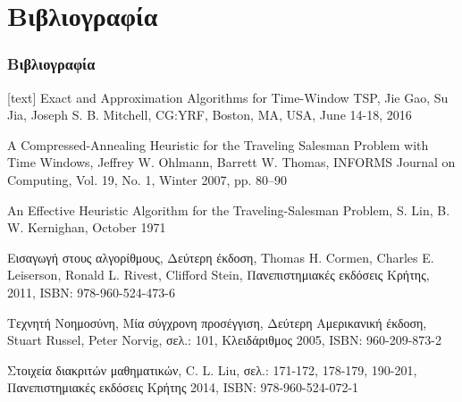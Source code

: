 \documentclass[xcolor=dvipsnames, 11pt]{beamer}
\begin{document}
\section{Βιβλιογραφία}
\begin{frame}
	\frametitle{Βιβλιογραφία}
	\footnotesize
	\begin{thebibliography}{depth}
		Exact and Approximation Algorithms for Time-Window TSP, 
		Jie Gao, Su Jia, Joseph S. B. Mitchell,
		CG:YRF, Boston, MA, USA, June 14-18, 2016
		
		A Compressed-Annealing Heuristic for the Traveling Salesman Problem with Time Windows, 
		Jeffrey W. Ohlmann, Barrett W. Thomas,
		INFORMS Journal on Computing,
		Vol. 19, No. 1, Winter 2007, pp. 80–90
		
		An Effective Heuristic Algorithm for the Traveling-Salesman Problem,
		S. Lin, B. W. Kernighan,
		October 1971
		
		Εισαγωγή στους αλγορίθμους, Δεύτερη έκδοση, 
		Thomas H. Cormen, Charles E. Leiserson, Ronald L. Rivest, Clifford Stein,
		Πανεπιστημιακές εκδόσεις Κρήτης, 2011,
		ISBN: 978-960-524-473-6
		
		Τεχνητή Νοημοσύνη, Μία σύγχρονη προσέγγιση, Δεύτερη Αμερικανική έκδοση, 
		Stuart Russel, Peter Norvig,
		σελ.: 101,
		Κλειδάριθμος 2005,
		ISBN: 960-209-873-2
		
		Στοιχεία διακριτών μαθηματικών, 
		C. L. Liu,
		σελ.: 171-172, 178-179, 190-201,
		Πανεπιστημιακές εκδόσεις Κρήτης 2014, 
		ISBN: 978-960-524-072-1	
	\end{thebibliography}
\end{frame}
\end{document}
